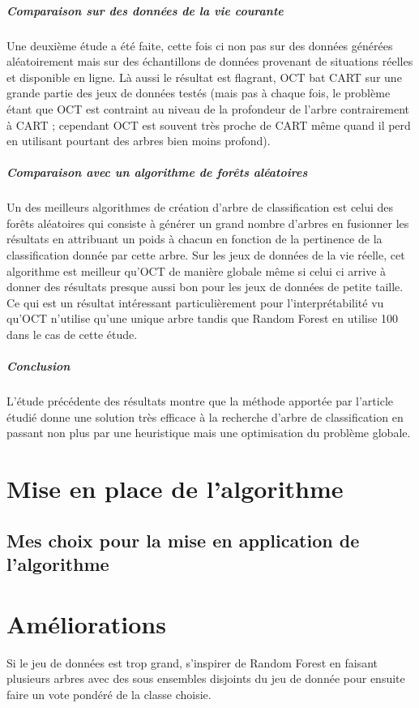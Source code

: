 \documentclass[12pt]{report}
\begin{document}
\paragraph{Comparaison sur des données de la vie courante} Une deuxième étude a été faite, cette fois ci non pas sur des données générées aléatoirement mais sur des échantillons de données provenant de situations réelles et disponible en ligne. Là aussi le résultat est flagrant, OCT bat CART sur une grande partie des jeux de données testés (mais pas à chaque fois, le problème étant que OCT est contraint au niveau de la profondeur de l'arbre contrairement à CART ; cependant OCT est souvent très proche de CART même quand il perd en utilisant pourtant des arbres bien moins profond).

\paragraph{Comparaison avec un algorithme de forêts aléatoires} Un des meilleurs algorithmes de création d'arbre de classification est celui des forêts aléatoires qui consiste à générer un grand nombre d'arbres en fusionner les résultats en attribuant un poids à chacun en fonction de la pertinence de la classification donnée par cette arbre. Sur les jeux de données de la vie réelle, cet algorithme est meilleur qu'OCT de manière globale même si celui ci arrive à donner des résultats presque aussi bon pour les jeux de données de petite taille. Ce qui est un résultat intéressant particulièrement pour l'interprétabilité vu qu'OCT n'utilise qu'une unique arbre tandis que Random Forest en utilise 100 dans le cas de cette étude.

\paragraph{Conclusion} L'étude précédente des résultats montre que la méthode apportée par l'article étudié donne une solution très efficace à la recherche d'arbre de classification en passant non plus par une heuristique mais une optimisation du problème globale.


\chapter{Mise en place de l'algorithme}

\section{Mes choix pour la mise en application de l'algorithme}

\chapter{Améliorations}

Si le jeu de données est trop grand, s'inspirer de Random Forest en faisant plusieurs arbres avec des sous ensembles disjoints du jeu de donnée pour ensuite faire un vote pondéré de la classe choisie.
\end{document}
